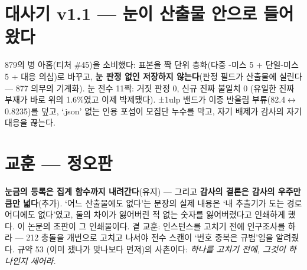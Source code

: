 \documentclass[10pt]{article}
\begin{document}
\section{대사기 v1.1 --- 눈이 산출물 안으로 들어왔다}

879의 병 아홉(티처 \#45)을 소비했다: 표본을 짝 단위 층화(다중
-미스 5 + 단일-미스 5 + 대응 의심)로 바꾸고, \textbf{눈 판정
없인 저장하지 않는다}(판정 필드가 산출물에 실린다 --- 877
의무의 기계화). 눈 전수 11짝: 거짓 판정 0, 신규 진짜 불일치 0
(유일한 진짜 부재가 바로 위의 1.6\%였고 이제 박제됐다).
±1ulp 밴드가 이중 반올림 부류(82.4$\leftrightarrow$0.8235)를
덮고, `.json' 없는 인용 포섭이 모집단 누수를 막고, 자기
배제가 감사의 자기 대응을 끊는다.

\section{교훈 --- 정오판}

\textbf{눈금의 등록은 집계 함수까지 내려간다}(유지) ---
그리고 \textbf{감사의 결론은 감사의 우주만큼만 넓다}(추가).
`어느 산출물에도 없다'는 문장의 실제 내용은 `내 추출기가 도는
경로 어디에도 없다'였고, 둘의 차이가 잃어버린 적 없는 숫자를
잃어버렸다고 인쇄하게 했다. 이 논문의 초판이 그 인쇄물이다. 곁 교훈: 인스턴스를
고치기 전에 인구조사를 하라 --- 212 충돌을 개번으로 고치고
나서야 전수 스캔이 `번호 중복은 규범'임을 알려줬다. 규약 53
(이미 쟀나가 맞나보다 먼저)의 사촌이다: \emph{하나를 고치기
전에, 그것이 하나인지 세어라.}
\end{document}
